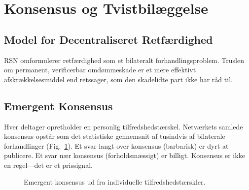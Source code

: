 \documentclass[11pt,a4paper,twocolumn]{article}
\begin{document}
\section{Konsensus og Tvistbilæggelse}

\subsection{Model for Decentraliseret Retfærdighed}

RSN omformulerer retfærdighed som et bilateralt forhandlingsproblem. Truslen om permanent, verificerbar omdømmeskade er et mere effektivt afskrækkelsesmiddel end retssager, som den skadelidte part ikke har råd til.

\subsection{Emergent Konsensus}

Hver deltager opretholder en personlig tilfredshedstærskel. Netværkets samlede konsensus opstår som det statistiske gennemsnit af tusindvis af bilaterale forhandlinger (Fig.~\ref{fig:consensus}). Et svar langt over konsensus (barbarisk) er dyrt at publicere. Et svar nær konsensus (forholdsmæssigt) er billigt. Konsensus er ikke en regel---det er et prissignal.

\begin{figure}[ht]
\centering
{}
\caption{Emergent konsensus ud fra individuelle tilfredshedstærskler.}
\label{fig:consensus}
\end{figure}
\end{document}
